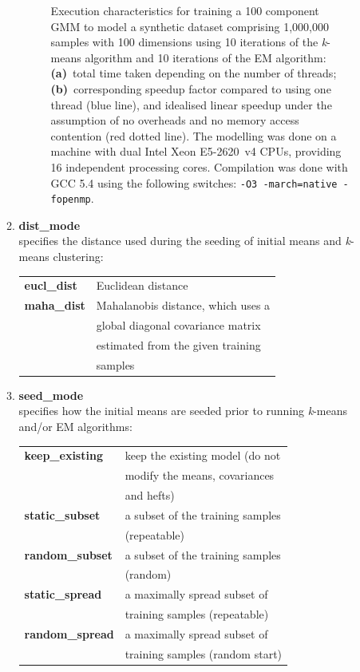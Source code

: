 \begin{itemize}
\begin{enumerate}[{$\cdot$}]
\begin{figure}[t!]
\caption
  {
  Execution characteristics for training a 100 component GMM
  to model a synthetic dataset comprising 1,000,000 samples with 100 dimensions
  using 10 iterations of the {\it k}-means algorithm and 10 iterations of the EM algorithm:
  {\bf (a)}~total time taken depending on the number of threads;
  {\bf (b)}~corresponding speedup factor compared to using one thread (blue line), and idealised linear speedup under the assumption of no overheads and no memory access contention (red dotted line).
  The modelling was done on a machine with dual Intel Xeon E5-2620~v4 CPUs, providing 16 independent processing cores.
  Compilation was done with GCC 5.4 using the following switches: \texttt{-O3 -march=native -fopenmp}.
  }
\label{fig:speedup}
\end{figure}


\item
{\bf dist\_mode}\\
specifies the distance used during the seeding of initial means and {\it k}-means clustering:

\begin{tabular}{ll}
{\bf eucl\_dist} & Euclidean distance\\
{\bf maha\_dist} & Mahalanobis distance, which uses a \\
                 & global diagonal covariance matrix \\
                 & estimated from the given training \\
                 & samples
\end{tabular}

\item
{\bf seed\_mode}\\
specifies how the initial means are seeded prior to running {\it k}-means and/or EM algorithms:

\vspace*{0.5em}
\begin{tabular}{ll}
{\bf keep\_existing} & keep the existing model (do not \\
                     & modify the means, covariances \\
                     & and hefts) \\
{\bf static\_subset} & a subset of the training samples \\
                     & (repeatable) \\
{\bf random\_subset} & a subset of the training samples \\
                     & (random) \\
{\bf static\_spread} & a maximally spread subset of \\
                     & training samples (repeatable) \\
{\bf random\_spread} & a maximally spread subset of \\
                     & training samples (random start) \\
\end{tabular}
\vspace*{0.5em}


\end{enumerate}
\end{itemize}
